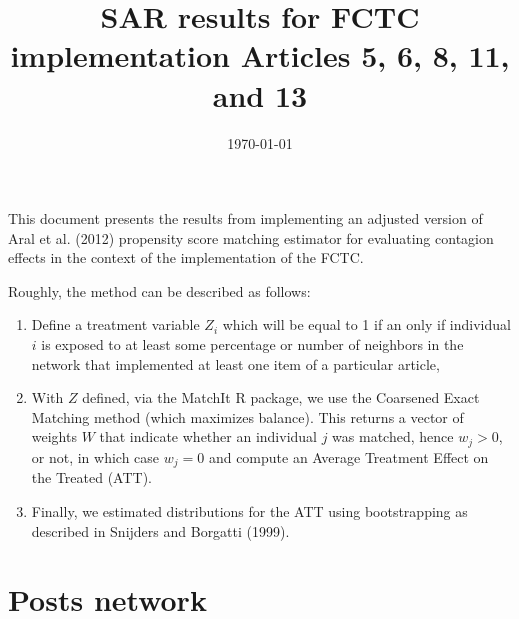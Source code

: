 \documentclass[10pt]{article}
\title{SAR results for FCTC implementation Articles 5, 6, 8, 11, and 13}
\date{\today}
\begin{document}
\maketitle
\tableofcontents

This document presents the results from implementing an adjusted version of Aral et al. (2012)
propensity score matching estimator for evaluating contagion effects in the context of
the implementation of the FCTC.

Roughly, the method can be described as follows:

\begin{enumerate}
\item Define a treatment variable $Z_i$ which will be equal to 1 if an only
if individual $i$ is exposed to at least some percentage or number of neighbors
in the network that implemented at least one item of a particular article,
\item With $Z$ defined, via the MatchIt R package, we use the Coarsened
Exact Matching method (which maximizes balance). This returns a vector of weights $W$ that indicate whether
an individual $j$ was matched, hence $w_j>0$, or not, in which case $w_j=0$ and
compute an Average Treatment Effect on the Treated (ATT).
\item Finally, we estimated distributions for the ATT using bootstrapping
as described in Snijders and Borgatti (1999).
\end{enumerate}

\section{Posts network}
\end{document}
